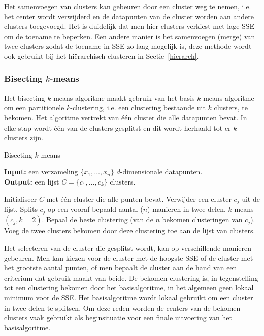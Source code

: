 \documentclass[a4paper,12pt]{article}
\theoremstyle{definition}
\begin{document}
Het samenvoegen van clusters kan gebeuren door een cluster weg te nemen, i.e. het center
wordt verwijderd en de datapunten van de cluster worden aan andere clusters toegevoegd.
Het is duidelijk dat men hier clusters verkiest met lage SSE om de toename te beperken.
Een andere manier is het samenvoegen (merge) van twee clusters zodat de toename in
SSE zo laag mogelijk is, deze methode wordt ook gebruikt bij het hiërarchisch
clusteren in Sectie~\ref{hierarch}.

\subsubsection{Bisecting $k$-means}
\label{bisect}
Het bisecting $k$-means algoritme maakt gebruik van het 
basis $k$-means algoritme om een partitionele $k$-clustering, i.e. een clustering
bestaande uit $k$ clusters, te bekomen. Het algoritme vertrekt van één cluster die
alle datapunten bevat. In elke stap wordt één van de clusters gesplitst en 
dit wordt herhaald tot er $k$ clusters zijn.

\begin{algorithm}
\caption{Bisecting $k$-means}\label{bisectalgo}
\textbf{Input:} een verzameling $\{x_1, \ldots, x_n\}$ $d$-dimensionale datapunten.\\
\textbf{Output:} een lijst $C = \{c_1, \ldots, c_k\}$ clusters.
\begin{algorithmic}[1]
\State Initialiseer $C$ met één cluster die alle punten bevat.
\State Verwijder een cluster $c_j$ uit de lijst.
\State Splits $c_j$ op een vooraf bepaald aantal ($n$) manieren in twee delen.
\State $k$-means$(c_j, k = 2)$.
\EndFor
\State Bepaal de beste clustering (van de $n$ bekomen clusteringen van $c_j$).
\State Voeg de twee clusters bekomen door deze clustering toe aan de lijst van clusters.
\EndWhile
\end{algorithmic}
\end{algorithm}

Het selecteren van de cluster die gesplitst wordt, kan op verschillende 
manieren gebeuren. Men kan kiezen voor de cluster met de hoogste SSE of de cluster
met het grootste aantal punten, of men bepaalt de cluster aan de hand van een
criterium dat gebruik maakt van beide. De bekomen clustering is, in tegenstelling
tot een clustering bekomen door het basisalgoritme, in het algemeen geen lokaal
minimum voor de SSE. Het basisalgoritme wordt lokaal gebruikt om een cluster in twee
delen te splitsen. Om deze reden worden de centers van de bekomen
clusters vaak gebruikt als beginsituatie voor een finale uitvoering van het basisalgoritme.
\end{document}
